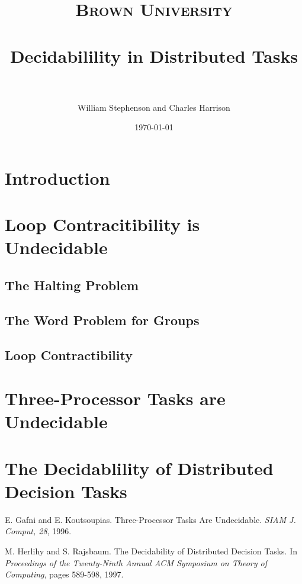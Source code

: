 \documentclass[paper=a4, fontsize=11pt]{scrartcl} %
\title{
\normalfont \normalsize
\textsc{Brown University} \\ [25pt] %
\horrule{0.5pt} \\[0.4cm] %
\huge Decidabilility in Distributed Tasks \\ %
\horrule{2pt} \\[0.5cm] %
}
\author{William Stephenson and Charles Harrison} %
\date{\normalsize\today} %
\numberwithin{equation}{section} %
\numberwithin{figure}{section} %
\numberwithin{table}{section} %
\begin{document}
\maketitle %

\section{Introduction}
\section{Loop Contracitibility is Undecidable}
	\subsection{The Halting Problem}
	\subsection{The Word Problem for Groups}
	\subsection{Loop Contractibility}

\section{Three-Processor Tasks are Undecidable}

\section{The Decidablility of Distributed Decision Tasks}


\begin{thebibliography}{2}

	E. Gafni and E. Koutsoupias. Three-Processor Tasks Are Undecidable. \emph{SIAM J. Comput, 28}, 1996.

	M. Herlihy and S. Rajsbaum. The Decidability of Distributed Decision Tasks. In \emph{Proceedings of the Twenty-Ninth Annual ACM Symposium on Theory of Computing}, pages 589-598, 1997.

\end{thebibliography}
\end{document}
